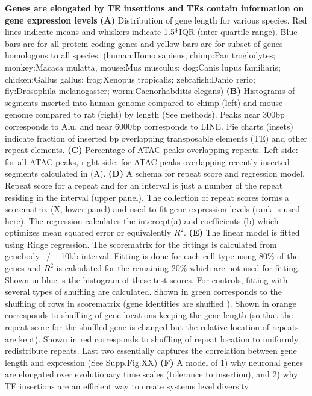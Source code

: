\textbf{Genes are elongated by TE insertions and TEs contain information on gene expression levels}
\textbf{(A)} Distribution of gene length for various species. Red lines indicate means and whiskers indicate 1.5*IQR (inter quartile range). Blue bars are for all protein coding genes and yellow bars are for subset of genes homologous to all species. (human:Homo sapiens; chimp:Pan troglodytes; monkey:Macaca mulatta, mouse:Mus musculus; dog:Canis lupus familiaris; chicken:Gallus gallus; frog:Xenopus tropicalis; zebrafish:Danio rerio; fly:Drosophila melanogaster; worm:Caenorhabditis  elegans)
\textbf{(B)} Histograms of segments inserted into human genome compared to chimp (left) and mouse genome compared to rat (right) by length (See methods). Peaks near 300bp corresponds to Alu, and near 6000bp corresponds to LINE. Pie charts (insets) indicate fraction of inserted bp overlapping transposable elements (TE) and other repeat elements.
\textbf{(C)} Percentage of ATAC peaks overlapping repeats. Left side: for all ATAC peaks, right side: for ATAC peaks overlapping recently inserted segments calculated in (A). 
\textbf{(D)} A schema for repeat score and regression model. Repeat score for a repeat and for an interval is just a number of the repeat residing in the interval (upper panel). The collection of repeat scores forms a scorematrix (X, lower panel) and used to fit gene expression levels (rank is used here). The regression calculates the intercept(a) and coefficients (b) which optimizes mean squared error or equivalently $R^2$. 
\textbf{(E)} The linear model is fitted using Ridge regression. The scorematrix for the fittings is calculated from genebody$+/-$10kb interval. Fitting is done for each cell type using 80\% of the genes and $R^2$ is calculated for the remaining 20\% which are not used for fitting. Shown in blue is the histogram of these test scores. For controls, fitting with several types of shuffling are calculated. Shown in green corresponds to the shuffling of rows in scorematrix (gene identities are shuffled ). Shown in orange corresponds to shuffling of gene locations keeping the gene length (so that the repeat score for the shuffled gene is changed but the relative location of repeats are kept). Shown in red corresponds to shuffling of repeat location to uniformly redistribute repeats. Last two essentially captures the correlation between gene length and expression (See Supp.Fig.XX)
\textbf{(F)} A model of 1) why neuronal genes are elongated over evolutionary time scales (tolerance to insertion), and 2) why TE insertions are an efficient way to create systems level diversity. 
